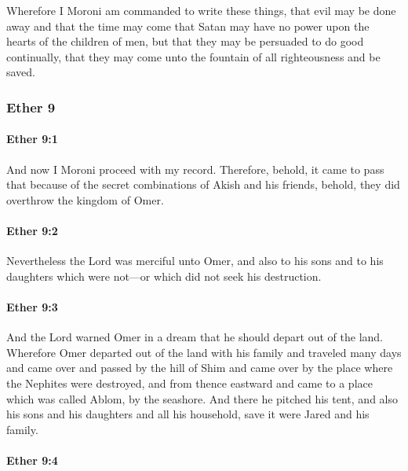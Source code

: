 			Wherefore I Moroni am commanded to write these things,
			that evil may be done away
			and that the time may come
			that Satan may have no power upon the hearts of the children of men,
			but that they may be persuaded to do good continually,
			that they may come unto the fountain of all righteousness and be saved.

	\subsubsection{Ether 9} %
		\label{ETHER-9}
		
		\paragraph{Ether 9:1} %
			\label{ETHER-9-1}

			And now I Moroni proceed with my record.
			Therefore, behold, it came to pass that
			because of the secret combinations of Akish and his friends,
			behold, they did overthrow the kingdom of Omer.

		\paragraph{Ether 9:2} %
			\label{ETHER-9-2}

			Nevertheless the Lord was merciful unto Omer,
			and also to his sons and to his daughters
			which were not---or which did not seek his destruction.

		\paragraph{Ether 9:3} %
			\label{ETHER-9-3}

			And the Lord warned Omer in a dream that he should depart out of the land.
			Wherefore Omer departed out of the land with his family
			and traveled many days and came over and passed by the hill of Shim
			and came over by the place where the Nephites were destroyed,
			and from thence eastward
			and came to a place which was called Ablom,
			by the seashore.
			And there he pitched his tent,
			and also his sons and his daughters and all his household,
			save it were Jared and his family.

		\paragraph{Ether 9:4} %
			\label{ETHER-9-4}

